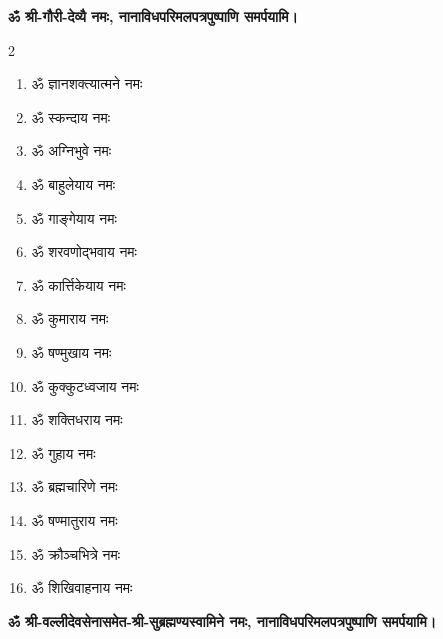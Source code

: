 \begin{center}
\textbf{ॐ श्री-गौरी-देव्यै नमः, नानाविधपरिमलपत्रपुष्पाणि समर्पयामि।} \medskip

\vspace{-1em}
\begin{multicols}{2}
\begin{enumerate}
\item ॐ ज्ञानशक्त्यात्मने नमः
\item ॐ स्कन्दाय नमः
\item ॐ अग्निभुवे नमः
\item ॐ बाहुलेयाय नमः
\item ॐ गाङ्गेयाय नमः
\item ॐ शरवणोद्भवाय नमः
\item ॐ कार्त्तिकेयाय नमः
\item ॐ कुमाराय नमः
\item ॐ षण्मुखाय नमः
\item ॐ कुक्कुटध्वजाय नमः
\item ॐ शक्तिधराय नमः
\item ॐ गुहाय नमः
\item ॐ ब्रह्मचारिणे नमः
\item ॐ षण्मातुराय नमः
\item ॐ क्रौञ्चभित्रे नमः
\item ॐ शिखिवाहनाय नमः
\end{enumerate}
\end{multicols}
\vspace{-1em}
\textbf{ॐ श्री-वल्लीदेवसेनासमेत-श्री-सुब्रह्मण्यस्वामिने नमः, नानाविधपरिमलपत्रपुष्पाणि समर्पयामि।} \medskip


\end{center}
